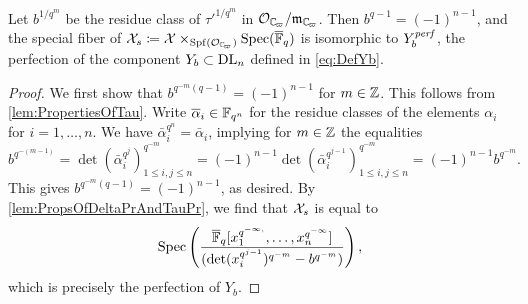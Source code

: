 \documentclass[../main.tex]{subfiles}
\begin{document}

\begin{prop}\label{prop:SpecialFiberOfAffinoidIsLusztig}
  Let $b^{1/q^m}$ be the residue class of $\tau'^{1/q^m}$ in $\cO_\Cp/\fm_{\Cp}$. 
  Then $b^{q-1} = (-1)^{n-1}$, and the special fiber of $\cX_s \coloneq \cX
  \times_{\spf(\cO_\Cp)} \spec (\Fqbar)$ is isomorphic to $Y_b^{\mathit{perf}}$, the
  perfection of the component $Y_b \subset \mathrm{DL}_n$ defined in \eqref{eq:DefYb}.
\begin{proof}
  We first show that $b^{q^{-m}(q-1)} = (-1)^{n-1}$ for $m \in \mathbb{Z}$. 
  This follows from \cref{lem:PropertiesOfTau}. 
  Write $\overline \alpha_i \in \mathbb{F}_{q^n}$ for the residue classes of the 
  elements $\alpha_i$ for $i = 1, \dots, n$. We have $\bar \alpha_i^{q^n}
  = \bar \alpha_i$, implying for $m \in \mathbb{Z}$ the equalities
  \begin{equation*}
    b^{q^{-(m-1)}} = \det(\bar \alpha_i^{q^j})_{1 \leq i,j \leq n}^{q^{-m}} =
    (-1)^{n-1} \det (\bar \alpha_i^{q^{j-1}})_{1 \leq i,j \leq n}^{q^{-m}} =
    (-1)^{n-1} b^{q^{-m}}.
  \end{equation*}
  This gives $b^{q^{-m}(q-1)} = (-1)^{n-1}$, as desired.
  By \cref{lem:PropsOfDeltaPrAndTauPr}, we find that $\mathcal{X}_s$ is equal to
  \begin{equation*}
    \operatorname{Spec} \left( \frac{{\overline {\mathbb{F}}_q} [x_1^{q^{-\infty,}}, \dots,
    x_n^{q^{-\infty}}]}{(\det(x_i^{q^{j-1}})^{q^{-m}}- b^{q^{-m}})} \right),
  \end{equation*}
  which is precisely the perfection of $Y_b$.
\end{proof}
\end{prop}
\end{document}
